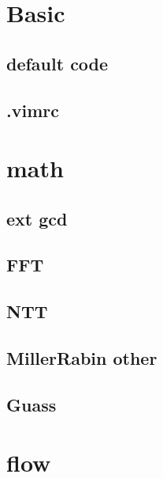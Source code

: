 \documentclass[12pt,twocolumn,oneside,a4paper]{article}
\begin{document}
\pagestyle{fancy}
\fancyfoot{}
\fancyhead[R]{\thepage}
\renewcommand{\headrulewidth}{0.4pt}
\renewcommand{\contentsname}{Contents} 

\scriptsize
\tableofcontents

\newpage

\section{Basic}
\subsection{default code}


\subsection{.vimrc}


\section{math}
\subsection{ext gcd}


\subsection{FFT}


\subsection{NTT}


\subsection{MillerRabin other}


\subsection{Guass}


\section{flow}
\end{document}
